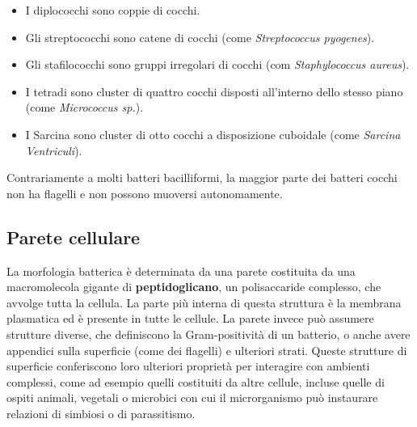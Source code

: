 \documentclass[../main.tex]{subfiles}
\begin{document}
\begin{itemize}
	\itemsep0em 
	\item I diplococchi sono coppie di cocchi.
	\item Gli streptococchi sono catene di cocchi (come \textit{Streptococcus pyogenes}).
	\item Gli stafilococchi sono gruppi irregolari di cocchi (com \textit{Staphylococcus aureus}).
	\item I tetradi sono cluster di quattro cocchi disposti all'interno dello stesso piano (come \textit{Micrococcus sp.}).
	\item I Sarcina sono cluster di otto cocchi a disposizione cuboidale (come \textit{Sarcina Ventriculi}).
\end{itemize}

Contrariamente a molti batteri bacilliformi, la maggior parte dei batteri cocchi non ha flagelli e non possono muoversi autonomamente.\cite{levinson_2018}

\subsection{Parete cellulare}

La morfologia batterica è determinata da una parete costituita da una macromolecola gigante di \textbf{peptidoglicano}, un polisaccaride complesso, che avvolge tutta la cellula. La parte più interna di questa struttura è la membrana plasmatica ed è presente in tutte le cellule. La parete invece può assumere strutture diverse, che definiscono la Gram-positività di un batterio, o anche avere appendici sulla superficie (come dei flagelli) e ulteriori strati.  Queste strutture di superficie conferiscono loro ulteriori proprietà per interagire con ambienti complessi, come ad esempio quelli costituiti da altre cellule, incluse quelle di ospiti animali, vegetali o microbici con cui il microrganismo può instaurare relazioni di simbiosi o di parassitismo.\cite{smith_1977}
\end{document}
